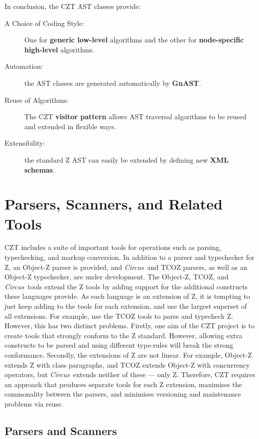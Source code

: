 \documentclass{llncs}
\newcommand{\Circus}{{\sf\slshape Circus}}
\begin{document}
  In conclusion, the CZT AST classes provide:
  \begin{description}
    \item[A Choice of Coding Style:] One for \textbf{generic low-level} algorithms
      and the other for \textbf{node-specific high-level} algorithms.
    \item[Automation:] the AST classes are generated automatically by
      \textbf{GnAST}.
    \item[Reuse of Algorithms:] The CZT \textbf{visitor pattern} allows
      AST traversal algorithms to be reused and extended in flexible ways.
    \item[Extensibility:] the standard Z AST can easily be extended by
      defining new \textbf{XML schemas}.
  \end{description}


\section{Parsers, Scanners, and Related Tools}
\label{parsers}

  CZT includes a suite of important tools for operations such as
  parsing, typechecking, and markup conversion. In addition to a
  parser and typechecker for Z, an Object-Z parser is provided, and
  \Circus\ and TCOZ parsers, as well as an Object-Z typechecker, are
  under development.  The Object-Z, TCOZ, and \Circus\ tools extend
  the Z tools by adding support for the additional constructs these
  languages provide.  As each language is an
  extension of Z, it is tempting to just keep adding to the tools
  for each extension, and use the largest superset of all
  extensions. For example, use the TCOZ tools to parse and typecheck
  Z. However, this has two distinct problems. Firstly, one aim of the
  CZT project is to create tools that strongly conform to the Z
  standard. However, allowing extra constructs to be parsed and using
  different type-rules will break the strong conformance. Secondly, the
  extensions of Z are not linear. For example, Object-Z extends Z with
  class paragraphs, and TCOZ extends Object-Z with concurrency
  operators, but \Circus\ extends neither of these --- only
  Z. Therefore, CZT requires an approach that produces separate tools
  for each Z extension, maximises the commonality between the parsers,
  and minimises versioning and maintenance problems via reuse.

\subsection{Parsers and Scanners}
\end{document}

